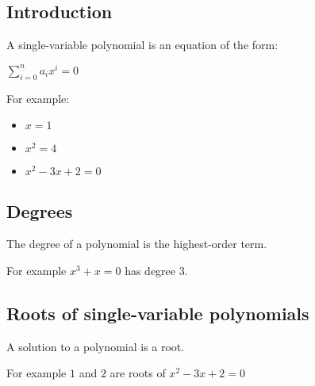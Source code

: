 
\subsection{Introduction}

A single-variable polynomial is an equation of the form:

\(\sum^n_{i=0} a_i x^i=0\)

For example:
\begin{itemize}
\item \(x=1\)
\item \(x^2=4\)
\item \(x^2-3x+2=0\)
\end{itemize}

\subsection{Degrees}

The degree of a polynomial is the highest-order term.

For example \(x^3+x=0\) has degree \(3\).

\subsection{Roots of single-variable polynomials}

A solution to a polynomial is a root.

For example \(1\) and \(2\) are roots of \(x^2-3x+2=0\)


